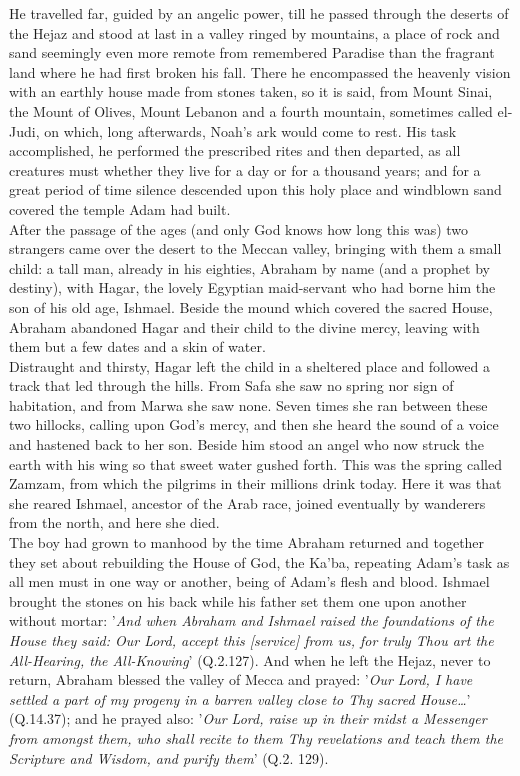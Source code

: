\documentclass[10pt, twoside]{book}
\begin{document}
He travelled far, guided by an angelic power, till he passed through the deserts of the Hejaz and 
stood at last in a valley ringed by mountains, a place of rock and sand seemingly even more remote 
from remembered Paradise than the fragrant land where he had first broken his fall. There he 
encompassed the heavenly vision with an earthly house made from stones taken, so it is said, from 
Mount Sinai, the Mount of Olives, Mount Lebanon and a fourth mountain, sometimes called el\hyp{}Judi, on 
which, long afterwards, Noah's ark would come to rest. His task accomplished, he performed the 
prescribed rites and then departed, as all creatures must whether they live for a day or for a 
thousand years; and for a great period of time silence descended upon this holy place and windblown sand covered the temple Adam had built. \\

After the passage of the ages (and only God knows how long this was) two strangers came over the 
desert to the Meccan valley, bringing with them a small child: a tall man, already in his eighties, 
Abraham by name (and a prophet by destiny), with Hagar, the lovely Egyptian maid\hyp{}servant who had 
borne him the son of his old age, Ishmael. Beside the mound which covered the sacred House, Abraham 
abandoned Hagar and their child to the divine mercy, leaving with them but a few dates and a skin of 
water. \\

Distraught and thirsty, Hagar left the child in a sheltered place and followed a track that led 
through the hills. From Safa she saw no spring nor sign of habitation, and from Marwa she saw none. 
Seven times she ran between these two hillocks, calling upon God's mercy, and then she heard the 
sound of a voice and hastened back to her son. Beside him stood an angel who now struck the earth 
with his wing so that sweet water gushed forth. This was the spring called Zamzam, from which the 
pilgrims in their millions drink today. Here it was that she reared Ishmael, ancestor of the Arab 
race, joined eventually by wanderers from the north, and here she died. \\

The boy had grown to manhood by the time Abraham returned and together they set about rebuilding the 
House of God, the Ka'ba, repeating Adam's task as all men must in one way or another, being of Adam's 
flesh and blood. Ishmael brought the stones on his back while his father set them one upon another 
without mortar: '\emph{And when Abraham and Ishmael raised the foundations of the House they said: Our Lord, accept this [service] from us, for truly Thou art the All\hyp{}Hearing, the All\hyp{}Knowing}' (Q.2.127). 
And when he left the Hejaz, never to return, Abraham blessed the valley of Mecca and prayed: '\emph{Our Lord, I have settled a part of my progeny in a barren valley close to Thy sacred House\ldots{}}' (Q.14.37); and he prayed also: '\emph{Our Lord, raise up in their midst a Messenger from amongst them, who shall recite to them Thy revelations and teach them the Scripture and Wisdom, and purify them}' (Q.2. 129). \\
\end{document}
